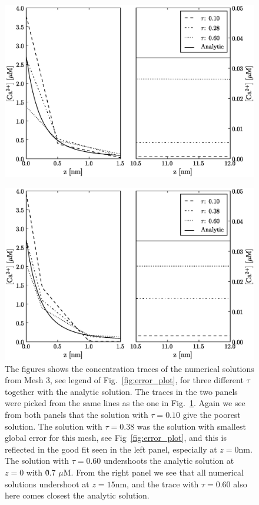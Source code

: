 \begin{figure}[t]
  \centering
    \includegraphics[width=\leftfigsize]{chapters/hake/eps/traces_mesh_2.eps}
    \caption{\captiontwo}
    \label{fig:traces_mesh_2}
\end{figure}

\newcommand{\captionthree}{The figures shows the concentration traces of the numerical solutions from Mesh 3, see legend of Fig.~\ref{fig:error_plot}, for three different $\tau$ together with the analytic solution. The traces in the two panels were picked from the same lines as the one in Fig.~\ref{fig:traces_mesh_2}. Again we see from both panels that the solution with $\tau=0.10$ give the poorest solution. The solution with $\tau=0.38$ was the solution with smallest global error for this mesh, see Fig~\ref{fig:error_plot}, and this is reflected in the good fit seen in the left panel, especially at $z=0$nm. The solution with $\tau=0.60$ undershoots the analytic solution at $z=0$ with \~0.7 $\mu$M. From the right panel we see that all numerical solutions undershoot at $z=15$nm, and the trace with $\tau=0.60$ also here comes closest the analytic solution.}

\begin{figure}[t]
  \centering
    \includegraphics[width=\leftfigsize]{chapters/hake/eps/traces_mesh_3.eps}
    \caption{\captionthree}
    \label{fig:traces_mesh_3}
\end{figure}


